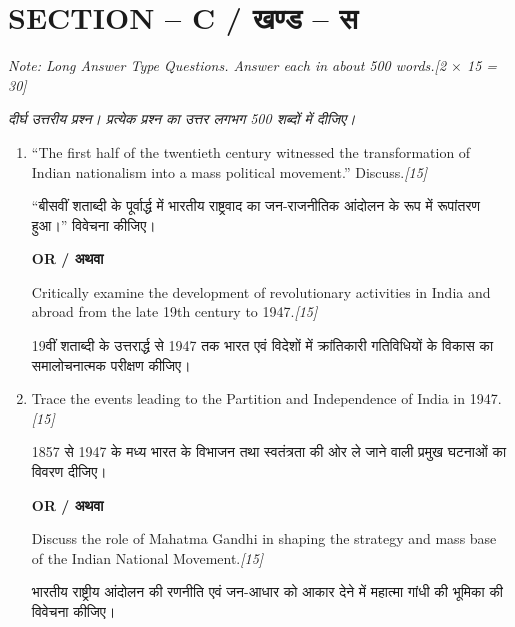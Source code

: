 \documentclass[11pt,a4paper]{article}
\newcommand{\pts}[1]{\hfill \textit{[#1]}}
\begin{document}
\bigskip

\section*{SECTION -- C / खण्ड -- स}
\noindent \textit{Note: Long Answer Type Questions. Answer each in about 500 words.}\pts{2 $\times$ 15 = 30}

\noindent \textit{दीर्घ उत्तरीय प्रश्न। प्रत्येक प्रश्न का उत्तर लगभग 500 शब्दों में दीजिए।}

\begin{enumerate}[label=\textbf{\arabic*.},leftmargin=*,start=5,itemsep=14pt]

  \item ``The first half of the twentieth century witnessed the transformation of Indian nationalism into a mass political movement.'' Discuss.\pts{15}
  
  ``बीसवीं शताब्दी के पूर्वार्द्ध में भारतीय राष्ट्रवाद का जन-राजनीतिक आंदोलन के रूप में रूपांतरण हुआ।'' विवेचना कीजिए।

  \begin{center}\textbf{OR / अथवा}\end{center}

  Critically examine the development of revolutionary activities in India and abroad from the late 19th century to 1947.\pts{15}
  
  19वीं शताब्दी के उत्तरार्द्ध से 1947 तक भारत एवं विदेशों में क्रांतिकारी गतिविधियों के विकास का समालोचनात्मक परीक्षण कीजिए।

  \item Trace the events leading to the Partition and Independence of India in 1947.\pts{15}
  
  1857 से 1947 के मध्य भारत के विभाजन तथा स्वतंत्रता की ओर ले जाने वाली प्रमुख घटनाओं का विवरण दीजिए।

  \begin{center}\textbf{OR / अथवा}\end{center}

  Discuss the role of Mahatma Gandhi in shaping the strategy and mass base of the Indian National Movement.\pts{15}
  
  भारतीय राष्ट्रीय आंदोलन की रणनीति एवं जन-आधार को आकार देने में महात्मा गांधी की भूमिका की विवेचना कीजिए।

\end{enumerate}
\end{document}
